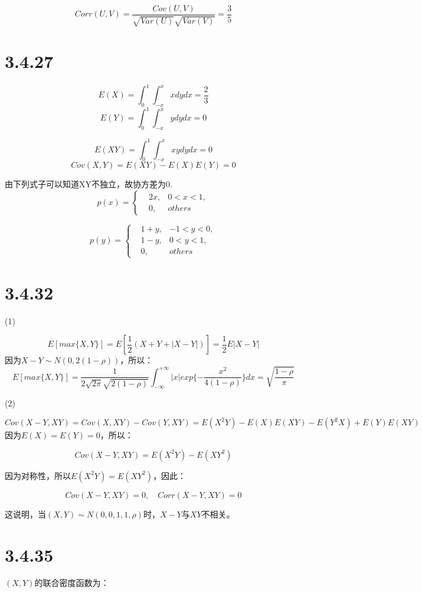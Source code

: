 \documentclass{article}
\begin{document}
$$Corr(U,V)=\frac{Cov(U,V)}{\sqrt{Var(U)}\sqrt{Var(V)}}=\frac35$$
\section{3.4.27}
$$E(X)=\int^1_0\int^x_{-x}xdydx=\frac23$$
$$E(Y)=\int_0^1\int^x_{-x}ydydx=0$$

$$E(XY)=\int^1_0\int^x_{-x}xydydx=0$$
$$Cov(X,Y)=E(XY)-E(X)E(Y)=0$$

由下列式子可以知道XY不独立，故协方差为0.
\begin{equation}
p(x)=\left\{
\begin{aligned}
&2x,&0<x<1,\\
&0,&others
\end{aligned}
\right.
\end{equation}

\begin{equation}
p(y)=\left\{
\begin{aligned}
&1+y,&-1<y<0,\\
&1-y,&0<y<1,\\
&0,&others
\end{aligned}
\right.
\end{equation}

\section{3.4.32}

(1)

$$E[max\{X,Y\}]=E[\frac12(X+Y+|X-Y|)]=\frac12E|X-Y|$$
因为$X-Y\sim N(0,2(1-\rho))$，所以：
$$E[max\{X,Y\}]=\frac{1}{2\sqrt{2\pi}\sqrt{2(1-\rho)}}\int^{+\infty}_{-\infty}|x|exp\{-\frac{x^2}{4(1-\rho)}\}dx=\sqrt{\frac{1-\rho}{\pi}}$$

(2)

$$Cov(X-Y,XY)=Cov(X,XY)-Cov(Y,XY)=E(X^2Y)-E(X)E(XY)-E(Y^2X)+E(Y)E(XY)$$
因为$E(X)=E(Y)=0$，所以：

$$Cov(X-Y,XY)=E(X^2Y)-E(XY^2)$$


因为对称性，所以$E(X^2Y)=E(XY^2)$，因此：

$$Cov(X-Y,XY)=0,\quad Corr(X-Y,XY)=0$$

这说明，当$(X,Y)\sim N(0,0,1,1,\rho)$时，$X-Y$与$XY$不相关。


\section{3.4.35}

$(X,Y)$的联合密度函数为：
\end{document}
